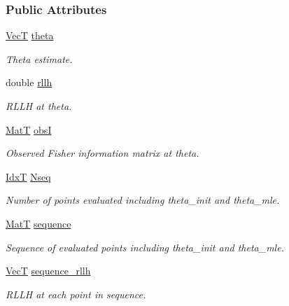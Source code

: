 \subsubsection*{Public Attributes}
\begin{DoxyCompactItemize}
\item 
\hyperlink{namespacemappel_a2225ad69f358daa3f4f99282a35b9a3a}{VecT} \hyperlink{structmappel_1_1estimator_1_1MLEDebugData_a9f62b8797034f80b369117f77ba39725}{theta}
\begin{DoxyCompactList}\small\item\em Theta estimate. \end{DoxyCompactList}\item 
double \hyperlink{structmappel_1_1estimator_1_1MLEDebugData_a6dea52884caeb6e2957d4242ea568e77}{rllh}
\begin{DoxyCompactList}\small\item\em R\+L\+LH at theta. \end{DoxyCompactList}\item 
\hyperlink{namespacemappel_a7091ab87c528041f7e2027195fad8915}{MatT} \hyperlink{structmappel_1_1estimator_1_1MLEDebugData_a6fadb423b602a1f671c8d6f211663fcc}{obsI}
\begin{DoxyCompactList}\small\item\em Observed Fisher information matrix at theta. \end{DoxyCompactList}\item 
\hyperlink{namespacemappel_ab17ec0f30b61ece292439d7ece81d3a8}{IdxT} \hyperlink{structmappel_1_1estimator_1_1MLEDebugData_a303db3c63b3d285760e814aea82af3a0}{Nseq}
\begin{DoxyCompactList}\small\item\em Number of points evaluated including theta\+\_\+init and theta\+\_\+mle. \end{DoxyCompactList}\item 
\hyperlink{namespacemappel_a7091ab87c528041f7e2027195fad8915}{MatT} \hyperlink{structmappel_1_1estimator_1_1MLEDebugData_a4419c4ee9559999be39df4a7469a47fa}{sequence}
\begin{DoxyCompactList}\small\item\em Sequence of evaluated points including theta\+\_\+init and theta\+\_\+mle. \end{DoxyCompactList}\item 
\hyperlink{namespacemappel_a2225ad69f358daa3f4f99282a35b9a3a}{VecT} \hyperlink{structmappel_1_1estimator_1_1MLEDebugData_a4e8b3ce8d1925480aadd942d34505568}{sequence\+\_\+rllh}
\begin{DoxyCompactList}\small\item\em R\+L\+LH at each point in sequence. \end{DoxyCompactList}\end{DoxyCompactItemize}


